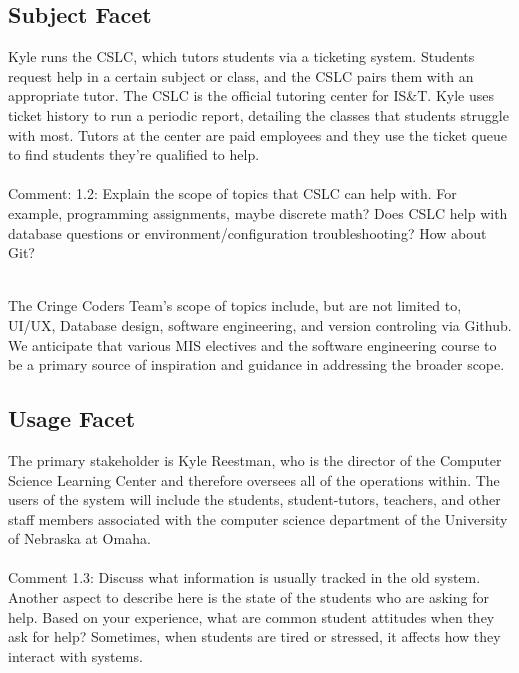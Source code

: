 \documentclass[oneside,openany,obeyspaces]{book}
\newcommand\tab[1][1cm]{\hspace*{#1}}
\newcommand\TeamName{Cringe Coders Team}
\begin{document}
\begin{flushleft}
    \subsection{Subject Facet}

    \tab Kyle runs the CSLC, which tutors students via a ticketing system. Students request help in a certain subject or class, and the CSLC pairs them with an appropriate tutor. The CSLC is the official tutoring center for IS\&T. Kyle uses ticket history to run a periodic report, detailing the classes that students struggle with most. Tutors at the center are paid employees and they use the ticket queue to find students they're qualified to help.\\~\\

    {\color{red}Comment: 1.2: Explain the scope of topics that CSLC can help with. For example, programming assignments, maybe discrete math? Does CSLC help with database questions or environment/configuration troubleshooting? How about Git? \\~\\}

    {\color{blue}\tab The \TeamName's scope of topics include, but are not limited to, UI/UX, Database design, software engineering, and version controling via Github. We anticipate that various MIS electives and the software engineering course to be a primary source of inspiration and guidance in addressing the broader scope.}
    \subsection{Usage Facet}

    \tab The primary stakeholder is Kyle Reestman, who is the director of the Computer Science Learning Center and therefore oversees all of the operations within. The users of the system will include the students, student-tutors, teachers, and other staff members associated with the computer science department of the University of Nebraska at Omaha.\\~\\

    {\color{red}Comment 1.3: Discuss what information is usually tracked in the old system. Another aspect to describe here is the state of the students who are asking for help. Based on your experience, what are common student attitudes when they ask for help? Sometimes, when students are tired or stressed, it affects how they interact with systems. \\~\\}


\end{flushleft}
\end{document}
